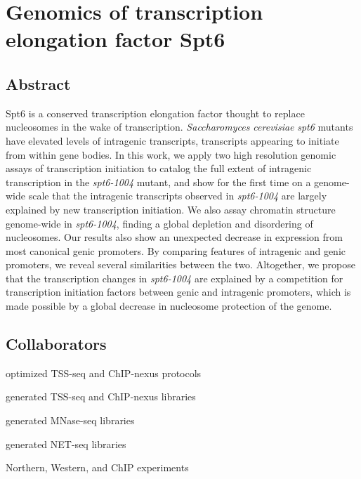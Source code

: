 \chapter{Genomics of transcription elongation factor Spt6}
\label{chapter:six}

\section{Abstract}

Spt6 is a conserved transcription elongation factor thought to replace nucleosomes in the wake of transcription.
\textit{Saccharomyces cerevisiae} \textit{spt6} mutants have elevated levels of intragenic transcripts, transcripts appearing to initiate from within gene bodies.
In this work, we apply two high resolution genomic assays of transcription initiation to catalog the full extent of intragenic transcription in the \textit{spt6-1004} mutant, and show for the first time on a genome-wide scale that the intragenic transcripts observed in \textit{spt6-1004} are largely explained by new transcription initiation.
We also assay chromatin structure genome-wide in \textit{spt6-1004}, finding a global depletion and disordering of nucleosomes.
Our results also show an unexpected decrease in expression from most canonical genic promoters.
By comparing features of intragenic and genic promoters, we reveal several similarities between the two.
Altogether, we propose that the transcription changes in \textit{spt6-1004} are explained by a competition for transcription initiation factors between genic and intragenic promoters, which is made possible by a global decrease in nucleosome protection of the genome.

\section{Collaborators}

\begin{description}[align=right, labelwidth=5cm, noitemsep]
    \item [Steve Doris] optimized TSS-seq and ChIP-nexus protocols
    \item [] generated TSS-seq and ChIP-nexus libraries
    \item [Olga Viktorovskaya] generated MNase-seq libraries
    \item [Magdalena Murawska] generated NET-seq libraries
    \item [Dan Spatt] Northern, Western, and ChIP experiments
\end{description}

